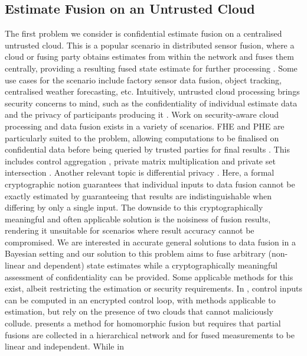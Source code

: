 \subsection{Estimate Fusion on an Untrusted Cloud}\label{subsec:intro:conf_est_fusion}
The first problem we consider is confidential estimate fusion on a centralised untrusted cloud. This is a popular scenario in distributed sensor fusion, where a cloud or fusing party obtains estimates from within the network and fuses them centrally, providing a resulting fused state estimate for further processing \cite{ligginsDistributedFusionArchitectures1997,bar-shalomEffectCommonProcess1986,heRangeFreeLocalizationSchemes2003,congOrderInsensitiveSequential2016,yonggangxuEstimationUncontrolledControlled2005,rosenthalSchedulingMeasurementTransmission2018}. Some use cases for the scenario include factory sensor data fusion, object tracking, centralised weather forecasting, etc. Intuitively, untrusted cloud processing brings security concerns to mind, such as the confidentiality of individual estimate data and the privacy of participants producing it \cite{renSecurityChallengesPublic2012,leiOutsourcingLargeMatrix2013,nandakumarProtectingGridTopology2019,zhangSecureDotProduct2017,schulzedarupEncryptedControlNetworked2021}. Work on security-aware cloud processing and data fusion exists in a variety of scenarios. FHE and PHE are particularly suited to the problem, allowing computations to be finalised on confidential data before being queried by trusted parties for final results \cite{lopez-altOntheflyMultipartyComputation2012,poteyHomomorphicEncryptionSecurity2016,zhaoCloudComputingSecurity2014}. This includes control aggregation \cite{alexandruEncryptedCooperativeControl2019}, private matrix multiplication \cite{kogisoCyberSecurityEnhancementNetworked2015} and private set intersection \cite{kerschbaumOutsourcedPrivateSet2012}. Another relevant topic is differential privacy \cite{dworkDifferentialPrivacySurvey2008,wilsonDifferentiallyPrivateSQL2019}. Here, a formal cryptographic notion guarantees that individual inputs to data fusion cannot be exactly estimated by guaranteeing that results are indistinguishable when differing by only a single input. The downside to this cryptographically meaningful and often applicable solution is the noisiness of fusion results, rendering it unsuitable for scenarios where result accuracy cannot be compromised. We are interested in accurate general solutions to data fusion in a Bayesian setting and our solution to this problem aims to fuse arbitrary (non-linear and dependent) state estimates while a cryptographically meaningful assessment of confidentiality can be provided. Some applicable methods for this exist, albeit restricting the estimation or security requirements. In \cite{daruEncryptedCloudbasedControl2019}, control inputs can be computed in an encrypted control loop, with methods applicable to estimation, but rely on the presence of two clouds that cannot maliciously collude. \cite{aristovEncryptedMultisensorInformation2018} presents a method for homomorphic fusion but requires that partial fusions are collected in a hierarchical network and for fused measurements to be linear and independent. While in 